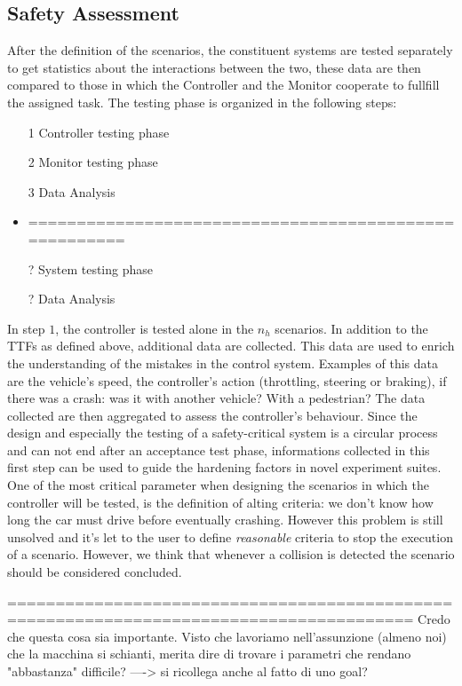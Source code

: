 \subsection{Safety Assessment}

After the definition of the scenarios, the constituent systems are tested separately to get statistics about the interactions between the two, these data are then compared to those in which the Controller and the Monitor cooperate to fullfill the assigned task.\newline
The testing phase is organized in the following steps:

\begin{itemize}
	\item[1] Controller testing phase
	\item[2] Monitor testing phase
	\item[3] Data Analysis
	\item ======================================================
	\item[?] System testing phase
	\item[?] Data Analysis
\end{itemize}

In step $1$, the controller is tested alone in the $n_{h}$ scenarios. In addition to the TTFs as defined above, additional data are collected. This data are used to enrich the understanding of the mistakes in the control system. Examples of this data are the vehicle's speed, the controller's action (throttling, steering or braking), if there was a crash: was it with another vehicle? With a pedestrian? The data collected are then aggregated to assess the controller's behaviour.\newline
Since the design and especially the testing of a safety-critical system is a circular process and can not end after an acceptance test phase, informations collected in this first step can be used to guide the hardening factors in novel experiment suites.\newline
One of the most critical parameter when designing the scenarios in which the controller will be tested, is the definition of alting criteria: we don't know how long the car must drive before eventually crashing. However this problem is still unsolved and it's let to the user to define \textsl{reasonable} criteria to stop the execution of a scenario. However, we think that whenever a collision is detected the scenario should be considered concluded.

========================================================================================
Credo che questa cosa sia importante. Visto che lavoriamo nell'assunzione (almeno noi) che la macchina si schianti, merita dire di trovare i parametri che rendano "abbastanza" difficile?   ----> si ricollega anche al fatto di uno goal?

